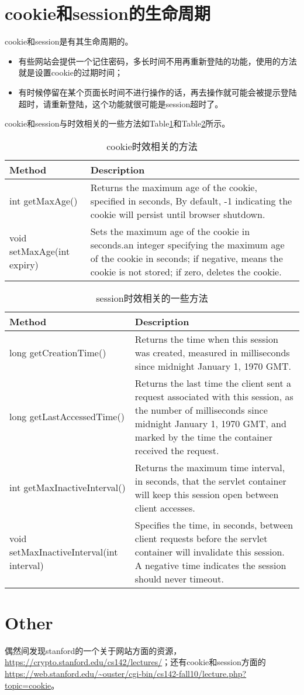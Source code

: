\section{cookie和session的生命周期}
cookie和session是有其生命周期的。
\begin{itemize}
\item
有些网站会提供一个记住密码，多长时间不用再重新登陆的功能，使用的方法就是设置cookie的过期时间；
\item
有时候停留在某个页面长时间不进行操作的话，再去操作就可能会被提示登陆超时，请重新登陆，这个功能就很可能是session超时了。
\end{itemize}
cookie和session与时效相关的一些方法如Table\ref{cookie}和Table\ref{session}所示。
\begin{table}
\begin{tabular}{lp{25em}}
\toprule
\textbf{Method}&\textbf{Description}\\
\midrule
int getMaxAge()&  Returns the maximum age of the cookie, specified in seconds, By default, -1 indicating the cookie will persist until browser shutdown.\\
void setMaxAge(int expiry) &  Sets the maximum age of the cookie in seconds.an integer specifying the maximum age of the cookie in seconds; if negative, means the cookie is not stored; if zero, deletes the cookie.\\
\bottomrule
\end{tabular}
\caption{cookie时效相关的方法}
\label{cookie}
\end{table}
\begin{table}
\begin{tabular}{lp{20em}}
\toprule
\textbf{Method}&\textbf{Description}\\
\midrule
long getCreationTime() &  Returns the time when this session was created, measured in milliseconds since midnight January 1, 1970 GMT.\\
long getLastAccessedTime() & Returns the last time the client sent a request associated with this session, as the number of milliseconds since midnight January 1, 1970 GMT, and marked by the time the container received the request.\\
int getMaxInactiveInterval() &  Returns the maximum time interval, in seconds, that the servlet container will keep this session open between client accesses.\\
void 	setMaxInactiveInterval(int interval) &  Specifies the time, in seconds, between client requests before the servlet container will invalidate this session. A negative time indicates the session should never timeout.\\
\bottomrule
\end{tabular}
\caption{session时效相关的一些方法}
\label{session}
\end{table}


\section{Other}
偶然间发现stanford的一个关于网站方面的资源，\url{https://crypto.stanford.edu/cs142/lectures/}；还有cookie和session方面的\url{https://web.stanford.edu/~ouster/cgi-bin/cs142-fall10/lecture.php?topic=cookie}。
